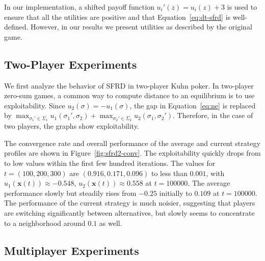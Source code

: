 \documentclass{aamas2014}
\newcommand{\bx}{\mathbf{x}}
\begin{document}
In our implementation, a shifted payoff function $u_i'(z) = u_i(z) + 3$ is used to ensure that all the utilities are positive
and that Equation~\ref{eq:dt-sfrd} is well-defined. However, in our results we present utilities as described by the original
game. %



\subsection{Two-Player Experiments}


We first analyze the behavior of SFRD in two-player Kuhn poker. 
In two-player zero-sum games, 
a common way to compute distance to an equilibrium is to use exploitability. Since $u_2(\sigma) = -u_1(\sigma)$, 
the gap in Equation~\ref{eq:ne} is replaced by 
$\max_{\sigma_1' \in \Sigma_1} u_1(\sigma_1', \sigma_2) + \max_{\sigma_2' \in \Sigma_2} u_2(\sigma_1, \sigma_2')$. 
Therefore, in the case of two players, the graphs show exploitability. 


The convergence rate and overall performance of the average and current strategy profiles are shown in
Figure~\ref{fig:sfrd2-conv}. The exploitability quickly drops from to low values within the first few hundred iterations. 
The values for $t = (100,200,300)$ are $(0.916, 0.171, 0.096)$ to less than $0.001$, with 
$u_1(\bx(t)) \approx -0.548$, $u_2(\bx(t)) \approx 0.558$ at $t = 100000$. 
The average performance slowly but steadily rises from $-0.25$ initially to $0.109$ at $t = 100000$. The performance of the 
current strategy is much noisier, suggesting that players are switching significantly between alternatives, 
but slowly seems to concentrate to a neighborhood around $0.1$ as well.

\subsection{Multiplayer Experiments}
\end{document}
